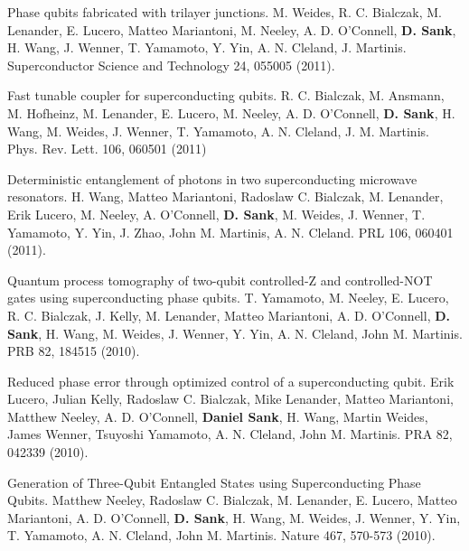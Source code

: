 \documentclass[margin=2cm,line]{res}
\newenvironment{list3}{
  \begin{list}{}{%
      \setlength{\itemsep}{0in}
      \setlength{\parsep}{0in} \setlength{\parskip}{0in}
      \setlength{\topsep}{0in} \setlength{\partopsep}{0in}
      \setlength{\leftmargin}{0.2in}}}{\end{list}}
\begin{document}
\begin{resume}
\begin{list3}
\item Phase qubits fabricated with trilayer junctions. M. Weides, R. C. Bialczak, M. Lenander, E. Lucero, Matteo Mariantoni, M. Neeley, A. D. O'Connell, \textbf{D. Sank}, H. Wang, J. Wenner, T. Yamamoto, Y. Yin, A. N. Cleland, J. Martinis. Superconductor Science and Technology 24, 055005 (2011). \\

\item Fast tunable coupler for superconducting qubits. R. C. Bialczak, M. Ansmann, M. Hofheinz, M. Lenander, E. Lucero, M. Neeley, A. D. O'Connell, \textbf{D. Sank}, H. Wang, M. Weides, J. Wenner, T. Yamamoto, A. N. Cleland, J. M. Martinis. Phys. Rev. Lett. 106, 060501 (2011) \\

\item Deterministic entanglement of photons in two superconducting microwave resonators. H. Wang, Matteo Mariantoni, Radoslaw C. Bialczak, M. Lenander, Erik Lucero, M. Neeley, A. O'Connell, \textbf{D. Sank}, M. Weides, J. Wenner, T. Yamamoto, Y. Yin, J. Zhao, John M. Martinis, A. N. Cleland. PRL 106, 060401 (2011). \\

\item Quantum process tomography of two-qubit controlled-Z and controlled-NOT gates using superconducting phase qubits. T. Yamamoto, M. Neeley, E. Lucero, R. C. Bialczak, J. Kelly, M. Lenander, Matteo Mariantoni, A. D. O'Connell, \textbf{D. Sank}, H. Wang, M. Weides, J. Wenner, Y. Yin, A. N. Cleland, John M. Martinis. PRB 82, 184515 (2010). \\

\item Reduced phase error through optimized control of a superconducting qubit. Erik Lucero, Julian Kelly, Radoslaw C. Bialczak, Mike Lenander, Matteo Mariantoni, Matthew Neeley, A. D. O'Connell, \textbf{Daniel Sank}, H. Wang, Martin Weides, James Wenner, Tsuyoshi Yamamoto, A. N. Cleland, John M. Martinis. PRA 82, 042339 (2010). \\

\item Generation of Three-Qubit Entangled States using Superconducting Phase Qubits. Matthew Neeley, Radoslaw C. Bialczak, M. Lenander, E. Lucero, Matteo Mariantoni, A. D. O'Connell, \textbf{D. Sank}, H. Wang, M. Weides, J. Wenner, Y. Yin, T. Yamamoto, A. N. Cleland, John M. Martinis. Nature 467, 570-573 (2010). \\


\end{list3}
\end{resume}
\end{document}
